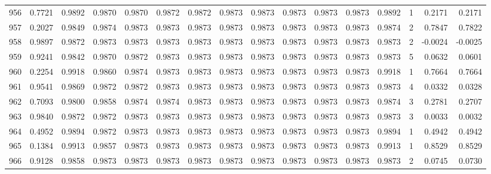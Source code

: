 \begin{tabular}{lrrrrrrrrrrrrrrr}
956 &      0.7721 &  0.9892 &  0.9870 &  0.9870 &  0.9872 &  0.9872 &  0.9873 &  0.9873 &  0.9873 &  0.9873 &   0.9873 &     0.9892 &      1 &                    0.2171 &                     0.2171 \\
957 &      0.2027 &  0.9849 &  0.9874 &  0.9873 &  0.9873 &  0.9873 &  0.9873 &  0.9873 &  0.9873 &  0.9873 &   0.9873 &     0.9874 &      2 &                    0.7847 &                     0.7822 \\
958 &      0.9897 &  0.9872 &  0.9873 &  0.9873 &  0.9873 &  0.9873 &  0.9873 &  0.9873 &  0.9873 &  0.9873 &   0.9873 &     0.9873 &      2 &                   -0.0024 &                    -0.0025 \\
959 &      0.9241 &  0.9842 &  0.9870 &  0.9872 &  0.9873 &  0.9873 &  0.9873 &  0.9873 &  0.9873 &  0.9873 &   0.9873 &     0.9873 &      5 &                    0.0632 &                     0.0601 \\
960 &      0.2254 &  0.9918 &  0.9860 &  0.9874 &  0.9873 &  0.9873 &  0.9873 &  0.9873 &  0.9873 &  0.9873 &   0.9873 &     0.9918 &      1 &                    0.7664 &                     0.7664 \\
961 &      0.9541 &  0.9869 &  0.9872 &  0.9872 &  0.9873 &  0.9873 &  0.9873 &  0.9873 &  0.9873 &  0.9873 &   0.9873 &     0.9873 &      4 &                    0.0332 &                     0.0328 \\
962 &      0.7093 &  0.9800 &  0.9858 &  0.9874 &  0.9874 &  0.9873 &  0.9873 &  0.9873 &  0.9873 &  0.9873 &   0.9873 &     0.9874 &      3 &                    0.2781 &                     0.2707 \\
963 &      0.9840 &  0.9872 &  0.9872 &  0.9873 &  0.9873 &  0.9873 &  0.9873 &  0.9873 &  0.9873 &  0.9873 &   0.9873 &     0.9873 &      3 &                    0.0033 &                     0.0032 \\
964 &      0.4952 &  0.9894 &  0.9872 &  0.9873 &  0.9873 &  0.9873 &  0.9873 &  0.9873 &  0.9873 &  0.9873 &   0.9873 &     0.9894 &      1 &                    0.4942 &                     0.4942 \\
965 &      0.1384 &  0.9913 &  0.9857 &  0.9873 &  0.9873 &  0.9873 &  0.9873 &  0.9873 &  0.9873 &  0.9873 &   0.9873 &     0.9913 &      1 &                    0.8529 &                     0.8529 \\
966 &      0.9128 &  0.9858 &  0.9873 &  0.9873 &  0.9873 &  0.9873 &  0.9873 &  0.9873 &  0.9873 &  0.9873 &   0.9873 &     0.9873 &      2 &                    0.0745 &                     0.0730 \\

\end{tabular}
